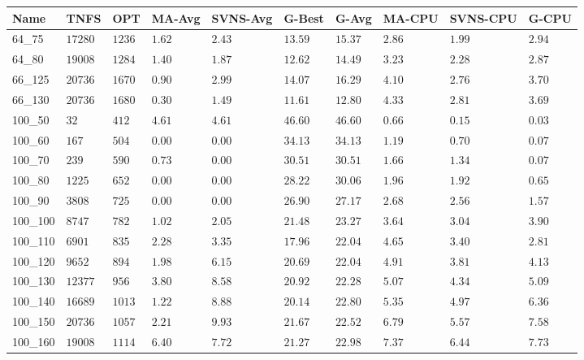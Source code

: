 \begin{center}
    \begin{table}[]
    \centering
    \begin{adjustwidth}{-0.4in}{-1in}
    \begin{tabular}{|lll|l|l|ll|lll|}
\hline
Name    & TNFS     & OPT    & MA-Avg & SVNS-Avg & G-Best & G-Avg & MA-CPU & SVNS-CPU & G-CPU \\
\hline
64\_75  & $17280$  & $1236$ & $1.62$ & $2.43$   & $13.59$ & $15.37$ & $2.86 $ & $1.99$ & $2.94$ \\
64\_80  & $19008$  & $1284$ & $1.40$ & $1.87$   & $12.62$ & $14.49$ & $3.23 $ & $2.28$ & $2.87$ \\
\hline
66\_125 & $20736$  & $1670$ & $0.90$ & $2.99$   & $14.07$ & $16.29$ & $4.10 $ & $2.76$ & $3.70$ \\
66\_130 & $20736$  & $1680$ & $0.30$ & $1.49$   & $11.61$ & $12.80$ & $4.33 $ & $2.81$ & $3.69$ \\
\hline
100\_50 & $32   $  & $412 $ & $4.61$ & $4.61$   & $46.60$ & $46.60$ & $0.66 $ & $0.15$ & $0.03$ \\
100\_60 & $167  $  & $504 $ & $\bm{0.00}$ & $\bm{0.00}$   & $34.13$ & $34.13$ & $1.19 $ & $0.70$ & $0.07$ \\
100\_70 & $239  $  & $590 $ & $0.73$ & $\bm{0.00}$   & $30.51$ & $30.51$ & $1.66 $ & $1.34$ & $0.07$ \\
100\_80 & $1225 $  & $652 $ & $\bm{0.00}$ & $\bm{0.00}$   & $28.22$ & $30.06$ & $1.96 $ & $1.92$ & $0.65$ \\
100\_90 & $3808 $  & $725 $ & $\bm{0.00}$ & $\bm{0.00}$   & $26.90$ & $27.17$ & $2.68 $ & $2.56$ & $1.57$ \\
100\_100& $8747 $  & $782 $ & $1.02$ & $2.05$   & $21.48$ & $23.27$ & $3.64 $ & $3.04$ & $3.90$ \\
100\_110& $6901 $  & $835 $ & $2.28$ & $3.35$   & $17.96$ & $22.04$ & $4.65 $ & $3.40$ & $2.81$ \\
100\_120& $9652 $  & $894 $ & $1.98$ & $6.15$   & $20.69$ & $22.04$ & $4.91 $ & $3.81$ & $4.13$ \\
100\_130& $12377$  & $956 $ & $3.80$ & $8.58$   & $20.92$ & $22.28$ & $5.07 $ & $4.34$ & $5.09$ \\
100\_140& $16689$  & $1013$ & $1.22$ & $8.88$   & $20.14$ & $22.80$ & $5.35 $ & $4.97$ & $6.36$ \\
100\_150& $20736$  & $1057$ & $2.21$ & $9.93$   & $21.67$ & $22.52$ & $6.79 $ & $5.57$ & $7.58$ \\
100\_160& $19008$  & $1114$ & $6.40$ & $7.72$   & $21.27$ & $22.98$ & $7.37 $ & $6.44$ & $7.73$ \\

\end{tabular}
\end{adjustwidth}
\end{table}
\end{center}
